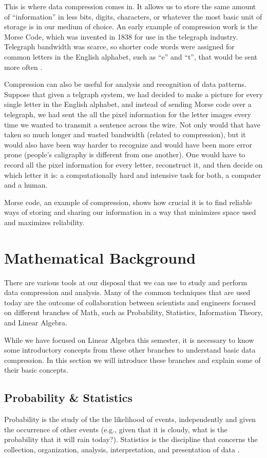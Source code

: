\documentclass[12pt]{report}
\begin{document}
        This is where data compression comes in. It allows us to store the same amount of ``information'' in less bits, digits, characters, or whatever the most basic unit of storage is in our medium of choice. An early example of compression work is the Morse Code, which was invented in 1838 for use in the telegraph industry. Telegraph bandwidth was scarce, so shorter code words were assigned for common letters in the English alphabet, such as ``e'' and ``t'', that would be sent more often \cite{Wolfram2002}.

        Compression can also be useful for analysis and recognition of data patterns. Suppose that given a telgraph system, we had decided to make a picture for every single letter in the English alphabet, and instead of sending Morse code over a telegraph, we had sent the all the pixel information for the letter images every time we wanted to transmit a sentence across the wire. Not only would that have taken so much longer and wasted bandwidth (related to compression), but it would also have been way harder to recognize and would have been more error prone (people's caligraphy is different from one another). One would have to record all the pixel information for every letter, reconstruct it, and then decide on which letter it is: a computationally hard and intensive task for both, a computer and a human.

        Morse code, an example of compression, shows how crucial it is to find reliable ways of storing and sharing our information in a way that minimizes space used and maximizes reliability.
    
    \chapter{Mathematical Background}
        There are various tools at our disposal that we can use to study and perform data compression and analysis. Many of the common techniques that are used today are the outcome of collaboration between scientists and engineers focused on different branches of Math, such as Probability, Statistics, Information Theory, and Linear Algebra.
        
        While we have focused on Linear Algebra this semester, it is necessary to know some introductory concepts from these other branches to understand basic data compression. In this section we will introduce these branches and explain some of their basic concepts.
        
        \section{Probability \& Statistics}
            Probability is the study of the the likelihood of events, independently and given the occurrence of other events (e.g., given that it is cloudy, what is the probability that it will rain today?). Statistics is the discipline that concerns the collection, organization, analysis, interpretation, and presentation of data \cite{wiki:Statistics}.
\end{document}
